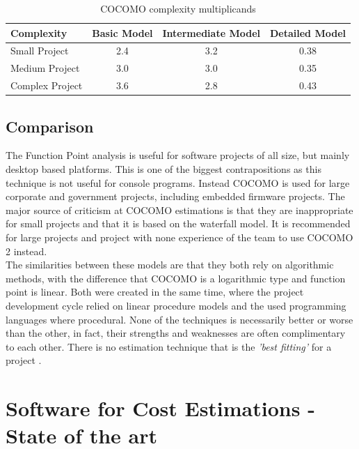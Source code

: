 \begin{table}[h]
	\centering 
	\setlength{\tabcolsep}{4pt}
	\begin{tabular}{|l|c|c|c|}\hline
		Complexity	&  Basic Model 		&  Intermediate Model	&  Detailed Model\\ \hline
		Small Project   	& 2.4      	& 3.2  					& 0.38	\\ \hline
		Medium Project 		& 3.0      	& 3.0  					& 0.35	\\ \hline
		Complex Project 	& 3.6 		& 2.8					& 0.43\\ \hline
	\end{tabular} 
	\caption{COCOMO complexity multiplicands} 
	\label{cocomo:complexity} 
\end{table}

\subsection{Comparison}

The Function Point analysis is useful for software projects of all size, but mainly desktop based platforms. This is one of the biggest contrapositions as this technique is not useful for console programs. Instead COCOMO is used for large corporate and government projects, including embedded firmware projects. The major source of criticism at COCOMO estimations is that they are inappropriate for small projects and that it is based on the waterfall model. It is recommended for large projects and project with none experience of the team to use COCOMO 2 instead.\\
The similarities between these models are that they both rely on algorithmic methods, with the difference that COCOMO is a logarithmic type and function point is linear. Both were created in the same time, where the project development cycle relied on linear procedure models and the used programming languages where procedural. None of the techniques is necessarily better or worse than the other, in fact, their strengths and weaknesses are often complimentary to each other. There is no estimation technique that is the \textit{'best fitting'} for a project \cite{estimationanalysis}.

\section{Software for Cost Estimations - State of the art}
\label{sec:stateofart}

